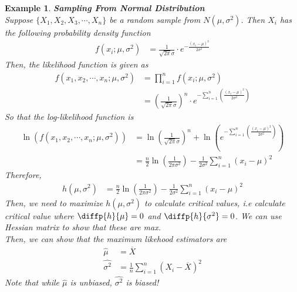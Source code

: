 \documentclass[11pt,oneside]{book}
\theoremstyle{newStyle}
\newtheorem{ex}{Example}[section]
\begin{document}
\begin{ex}
\textbf{Sampling From Normal Distribution}\\
Suppose $\{X_1,X_2,X_3,\cdots,X_n\}$ be a random sample from $N(\mu,\sigma^2)$. Then $X_i$ has the following probability density function \begin{align*}
f(x_i;\mu,\sigma^2)&=\frac{1}{\sqrt{2\pi} \sigma}\cdot e^{-\frac{(x_i-\mu)^2}{2\sigma^2}}
\end{align*} 
Then, the likelihood function is given as \begin{align*}
f(x_1,x_2,\cdots,x_n;\mu, \sigma^2)&=\prod_{i=1}^n f(x_i;\mu, \sigma^2)\\
&=\left(\frac{1}{\sqrt{2\pi}\sigma} \right)^n\cdot e^{-\sum_{i=1}^n\left(\frac{(x_i-\mu)^2}{2\sigma^2} \right)}
\end{align*}
So that the log-likelihood function is \begin{align*}
\ln(f(x_1,x_2,\cdots,x_n;\mu,\sigma^2))&=\ln\left(\frac{1}{\sqrt{2\pi}\sigma} \right)^n+\ln \left( e^{-\sum_{i=1}^n\left(\frac{(x_i-\mu)^2}{2\sigma^2}\right)}\right)\\
&=\frac{n}{2}\ln \left(\frac{1}{2\pi \sigma^2} \right)-\frac{1}{2\sigma^2}\sum_{i=1}^n(x_i-\mu)^2
\end{align*}
Therefore, \begin{align*}
h(\mu, \sigma^2)&=\frac{n}{2}\ln\left(\frac{1}{2\pi \sigma^2} \right)-\frac{1}{2\sigma^2}\sum_{i=1}^n(x_i-\mu)^2
\end{align*}
Then, we need to maximize $h(\mu,\sigma^2)$ to calculate critical values, i.e calculate critical value where $\diffp{h}{\mu}=0 $ and $\diffp{h}{{{\sigma^2}}}=0 $. We can use Hessian matrix to show that these are max.\\
Then, we can show that the maximum likehood estimators are \begin{align*}
\widehat{\mu}&=\overline{X}\\
\widehat{\sigma^2}&=\frac{1}{n}\sum_{i=1}^n\left(X_i-\overline{X} \right)^2
\end{align*}
Note that while $\widehat{\mu}$ is unbiased, $\widehat{\sigma^2}$ is biased!
\end{ex}
\end{document}

